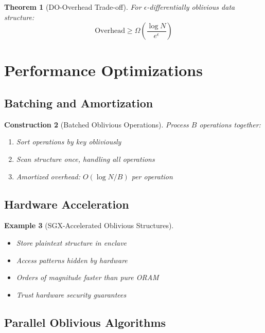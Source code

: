 \documentclass[11pt,final,hidelinks]{article}
\newtheorem{theorem}{Theorem}[section]
\newtheorem{example}[theorem]{Example}
\newtheorem{construction}[theorem]{Construction}
\begin{document}
\begin{theorem}[DO-Overhead Trade-off]
For $\epsilon$-differentially oblivious data structure:
\begin{equation}
\text{Overhead} \geq \Omega\left(\frac{\log N}{e^\epsilon}\right)
\end{equation}
\end{theorem}

\section{Performance Optimizations}

\subsection{Batching and Amortization}

\begin{construction}[Batched Oblivious Operations]
Process $B$ operations together:
\begin{enumerate}
    \item Sort operations by key obliviously
    \item Scan structure once, handling all operations
    \item Amortized overhead: $O(\log N / B)$ per operation
\end{enumerate}
\end{construction}

\subsection{Hardware Acceleration}

\begin{example}[SGX-Accelerated Oblivious Structures]
\begin{itemize}
    \item Store plaintext structure in enclave
    \item Access patterns hidden by hardware
    \item Orders of magnitude faster than pure ORAM
    \item Trust hardware security guarantees
\end{itemize}
\end{example}

\subsection{Parallel Oblivious Algorithms}
\end{document}
